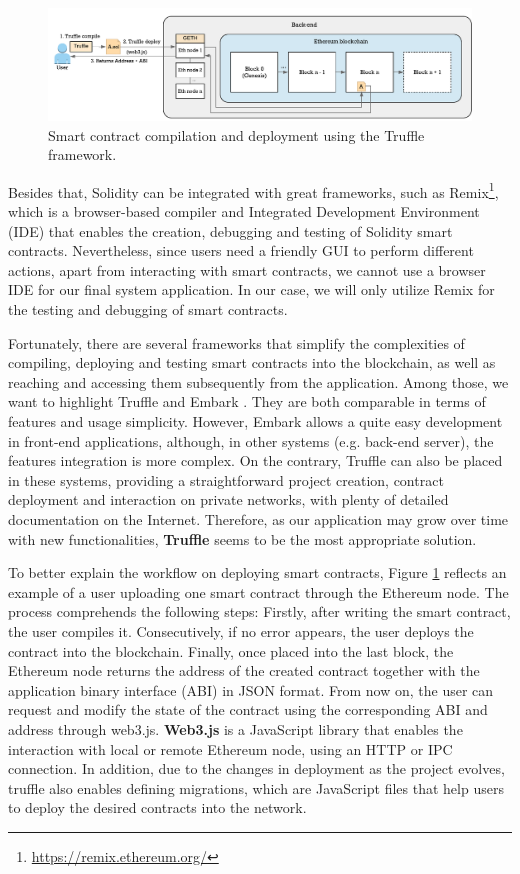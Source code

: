 \begin{figure}[bth]
	\centering
	\includegraphics[width=1\linewidth]{gfx/Smart_contract_workflow}    
  	\caption{Smart contract compilation and deployment using the Truffle framework.}
  	\label{fig:smartContractWorkflow}
\end{figure}

Besides that, Solidity can be integrated with great frameworks, such as Remix\footnote{\url{https://remix.ethereum.org/}}, which is a browser-based compiler and Integrated Development Environment (IDE) that enables the creation, debugging and testing of Solidity smart contracts. Nevertheless, since users need a friendly GUI to perform different actions, apart from interacting with smart contracts, we cannot use a browser IDE for our final system application. In our case, we will only utilize Remix for the testing and debugging of smart contracts. 

Fortunately, there are several frameworks that simplify the complexities of compiling, deploying and testing smart contracts into the blockchain, as well as reaching and accessing them subsequently from the application. Among those, we want to highlight Truffle \citep{Truffle2015} and Embark \citep{Embark2016}. They are both comparable in terms of features and usage simplicity. However, Embark allows a quite easy development in front-end applications, although, in other systems (e.g. back-end server), the features integration is more complex. On the contrary, Truffle can also be placed in these systems, providing a straightforward project creation, contract deployment and interaction on private networks, with plenty of detailed documentation on the Internet. Therefore, as our application may grow over time with new functionalities, \textbf{Truffle} seems to be the most appropriate solution.

To better explain the workflow on deploying smart contracts, Figure \ref{fig:smartContractWorkflow} reflects an example of a user uploading one smart contract through the Ethereum node. The process comprehends the following steps: Firstly, after writing the smart contract, the user compiles it. Consecutively, if no error appears, the user deploys the contract into the blockchain. Finally, once placed into the last block, the Ethereum node returns the address of the created contract together with the application binary interface (ABI) in JSON format. From now on, the user can request and modify the state of the contract using the corresponding ABI and address through web3.js. \textbf{Web3.js} is a JavaScript library that enables the interaction with local or remote Ethereum node, using an HTTP or IPC connection. In addition, due to the changes in deployment as the project evolves, truffle also enables defining migrations, which are JavaScript files that help users to deploy the desired contracts into the network. 


